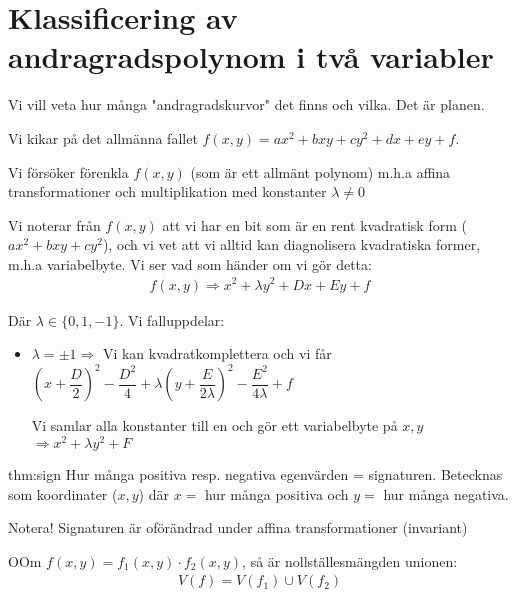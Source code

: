 \section{Klassificering av andragradspolynom i två variabler}
\par\bigskip
\noindent Vi vill veta hur många "andragradskurvor" det finns och vilka. Det är planen.\par
\noindent Vi kikar på det allmänna fallet $f(x,y)=ax^2+bxy+cy^2+dx+ey+f$.\par
\noindent Vi försöker förenkla $f(x,y)$ (som är ett allmänt polynom) m.h.a affina transformationer och multiplikation med konstanter $\lambda \neq0$
\par\bigskip
\noindent Vi noterar från $f(x,y)$ att vi har en bit som är en rent kvadratisk form ($ax^2+bxy+cy^2$), och vi vet att vi alltid kan diagnolisera kvadratiska former, m.h.a variabelbyte. Vi ser vad som händer om vi gör detta:
\begin{equation*}
  \begin{gathered}
    f(x,y)\Rightarrow x^2+\lambda y^2 + Dx+Ey+f
  \end{gathered}
\end{equation*}\par
\noindent Där $\lambda\in\{0,1,-1\}$. Vi falluppdelar:
\begin{itemize}
  \item $\lambda = \pm 1\Rightarrow$ Vi kan kvadratkomplettera och vi får $\left(x+\dfrac{D}{2}\right)^2-\dfrac{D^2}{4}+\lambda\left(y+\dfrac{E}{2\lambda}\right)^2-\dfrac{E^2}{4\lambda}+f$
    \par\bigskip
    \noindent Vi samlar alla konstanter till en och gör ett variabelbyte på $x,y$ $\Rightarrow x^2+\lambda y^2+F$
\end{itemize}
\par\bigskip
\begin{theo}{thm:sign}
  Hur många positiva resp. negativa egenvärden = signaturen. Betecknas som koordinater ($x,y$) där $x=$ hur många positiva och $y=$ hur många negativa.
  \par\bigskip
  \noindent Notera! Signaturen är oförändrad under affina transformationer (invariant)
\end{theo}
\par\bigskip
\begin{theo}
  OOm $f(x,y) = f_1(x,y)\cdot f_2(x,y)$, så är nollställesmängden unionen:
  \begin{equation*}
    \begin{gathered}
      V(f) = V(f_1)\cup V(f_2)
    \end{gathered}
  \end{equation*}
\end{theo}
